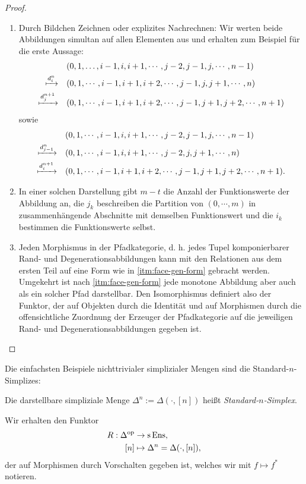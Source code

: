 \begin{proof}
  \begin{enumerate}[label=(\roman*)]
  \item Durch Bildchen Zeichnen oder explizites Nachrechnen: Wir
  werten beide Abbildungen simultan auf allen Elementen aus und
  erhalten zum Beispiel für die erste Aussage:
  \begin{align*}
  &(0, 1, \dots, i-1, i, i+1, \cdots, j-2, j-1, j, \cdots, n-1) \\
  \xmapsto{d_i^n} \quad
  &(0, 1, \cdots, i-1, i+1, i+2, \cdots, j-1, j, j+1, \cdots, n) \\
  \xmapsto{d_j^{n+1}} \quad
  &(0, 1, \cdots, i-1, i+1, i+2, \cdots, j-1, j+1, j+2, \cdots, n+1)
  \end{align*}
  sowie
  \begin{align*}
  &(0, 1, \cdots, i-1, i, i+1, \cdots, j-2, j-1, j, \cdots, n-1) \\
  \xmapsto{d_{j-1}^n} \quad
  &(0, 1, \cdots, i-1, i, i+1, \cdots, j-2, j, j+1, \cdots, n) \\
  \xmapsto{d_i^{n+1}} \quad
  &(0, 1, \cdots, i-1, i+1, i+2, \cdots, j-1, j+1, j+2, \cdots, n+1).
  \end{align*}

  \item In einer solchen Darstellung gibt $m - t$ die Anzahl der
  Funktionswerte der Abbildung an, die $j_k$ beschreiben die Partition
  von $(0, \cdots, m)$ in zusammenhängende Abschnitte mit demselben
  Funktionswert und die $i_k$ bestimmen die Funktionswerte selbst.

  \item Jeden Morphismus in der Pfadkategorie, d. h. jedes Tupel
  komponierbarer Rand- und Degenerationsabbildungen kann mit den
  Relationen aus dem ersten Teil auf eine Form wie
  in \ref{itm:face-gen-form} gebracht werden. Umgekehrt ist
  nach \ref{itm:face-gen-form} jede monotone Abbildung aber auch als
  ein solcher Pfad darstellbar. Den Isomorphismus definiert also der
  Funktor, der auf Objekten durch die Identität und auf Morphismen
  durch die offensichtliche Zuordnung der Erzeuger der Pfadkategorie
  auf die jeweiligen Rand- und Degenerationsabbildungen gegeben ist.
\end{enumerate}
\end{proof}

Die einfachsten Beispiele nichttrivialer simplizialer Mengen sind die
Standard-$n$-Simplizes:
\begin{defn} \label{def:comb-standard-simplex}
  Die darstellbare simpliziale Menge $\Delta^n := \Delta(\cdot, [n])$
  heißt \emph{Standard-$n$-Simplex}.
\end{defn}
Wir erhalten den Funktor
\begin{align*}
  R: \Delta^\mathrm{op} &\to \operatorname{s}\operatorname{Ens}, \\
  [n] &\mapsto \Delta^n = \Delta(\cdot, [n]),
\end{align*}
der auf Morphismen durch Vorschalten gegeben ist, welches wir mit
$f \mapsto f^*$ notieren.

